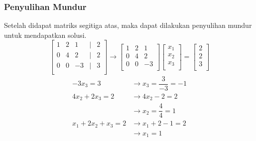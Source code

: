 \documentclass{beamer}
\begin{document}
\begin{frame}
\frametitle{Penyulihan Mundur}
Setelah didapat matriks segitiga atas, maka dapat dilakukan penyulihan mundur untuk mendapatkan solusi.
\begin{equation}
\begin{bmatrix}
	1 & 2 & 1 &| &2\\
	0 & 4 & 2&| &2\\
	0 & 0 & -3&| &3\\
\end{bmatrix} \longrightarrow 
\begin{bmatrix}
	1 & 2 & 1\\
	0 & 4 & 2\\
	0 & 0 & -3\\
\end{bmatrix}\begin{bmatrix}
	x_1\\
	x_2\\
	x_3\\
\end{bmatrix}=\begin{bmatrix}
	2\\
	2\\
	3\\
\end{bmatrix}
\nonumber
\end{equation}
\begin{equation}
\begin{split}
-3x_3 = 3 &\rightarrow x_3=\dfrac{3}{-3}=\boxed{-1}
\\4x_2+2x_3=2 &\rightarrow 4x_2-2=2 \\&\rightarrow x_2=\dfrac{4}{4} = \boxed{1}
\\x_1+2x_2+x_3=2 &\rightarrow x_1+2-1=2
\\&\rightarrow x_1=\boxed{1}
\end{split}
\nonumber
\end{equation}

\end{frame}


\end{document}

